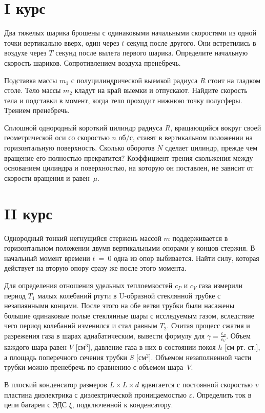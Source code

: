 \section{I курс}

\AddProb Два тяжелых шарика брошены с одинаковыми начальными скоростями из одной точки вертикально вверх, один через $t$ секунд после другого. 
Они встретились в воздухе через $T$ секунд после вылета первого шарика. Определите начальную скорость шариков. Сопротивлением воздуха пренебречь.

\AddProb Подставка массы $m_1$ с полуцилиндрической выемкой радиуса $R$ стоит на гладком столе. 
Тело массы $m_2$ кладут на край выемки и отпускают. Найдите скорость тела и подставки в 
момент, когда тело проходит нижнюю точку полусферы. Трением пренебречь.

\AddProb Сплошной однородный короткий цилиндр радиуса $R$, вращающийся вокруг своей 
геометрической оси со скоростью $n$ об/с, ставят в вертикальном положении на 
горизонтальную поверхность. Сколько оборотов $N$ сделает цилиндр, прежде чем вращение его 
полностью прекратится? Коэффициент трения скольжения между основанием цилиндра и 
поверхностью, на которую он поставлен, не зависит от скорости вращения и равен~$\mu$.


\section{II курс}

\AddProb Однородный тонкий негнущийся стержень массой $m$ поддерживается в горизонтальном 
положении двумя вертикальными опорами у концов стержня. В начальный момент времени $t$~=~0 одна из  
опор выбивается. Найти силу, которая действует на вторую опору сразу же после этого момента. 

\AddProb Для определения отношения удельных теплоемкостей $c_P$ и $c_V$ газа измерили период $T_1$ малых 
колебаний ртути в U-образной стеклянной трубке с незапаянными концами. После этого на обе ветви 
трубки были насажены большие одинаковые полые стеклянные шары с исследуемым газом, вследствие 
чего период колебаний изменился и стал равным $T_2$. Считая процесс сжатия и разрежения газа в шарах 
адиабатическим, вывести формулу для $\gamma = \frac{c_P}{c_V}$. Объем каждого шара равен $V$ [см$^3$], давление газа в них в 
состоянии покоя $h$ [см рт. ст.], а площадь поперечного сечения трубки $S$ [см$^2$]. Объемом незаполненной 
части трубки можно пренебречь по сравнению с объемом шара~$V$.

\AddProb В плоский конденсатор размеров $L\times L\times d$ вдвигается с постоянной скоростью $v$ пластина 
диэлектрика с диэлектрической проницаемостью $\varepsilon$. Определить ток в цепи батареи с ЭДС $\xi$, 
подключенной к конденсатору.


